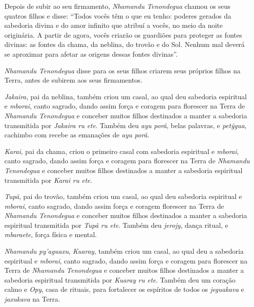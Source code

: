  



Depois de subir ao seu firmamento, \emph{Nhamandu Tenondegua} chamou os
seus quatros filhos e disse: ``Todos vocês têm o que eu tenho: poderes
gerados da sabedoria divina e do amor infinito que atribuí a vocês, no
meio da noite originária. A partir de agora, vocês criarão os guardiões
para proteger as fontes divinas: as fontes da chama, da neblina, do
trovão e do Sol. Nenhum mal deverá se aproximar para afetar as origens
dessas fontes divinas''.

\emph{Nhamandu Tenondegua} disse para os seus filhos criarem seus
próprios filhos na Terra, antes de subirem aos seus firmamentos.

\emph{Jakaira}, pai da neblina, também criou um casal, ao qual deu
sabedoria espiritual e \emph{mborai}, canto sagrado, dando assim força e
coragem para florescer na Terra de \emph{Nhamandu Tenondegua} e conceber
muitos filhos destinados a manter a sabedoria transmitida por
\emph{Jakaira ru ete}. Também deu \emph{ayu porã}, belas palavras, e
\emph{petỹgua}, cachimbo com recebe as emanações de \emph{ayu porã}.


 

\emph{Karai}, pai da chama, criou o primeiro casal com sabedoria
espiritual e \emph{mborai}, canto sagrado, dando assim força e coragem
para florescer na Terra de \emph{Nhamandu Tenondegua} e conceber muitos
filhos destinados a manter a sabedoria espiritual transmitida por
\emph{Karai ru ete}.

\emph{Tupã}, pai do trovão, também criou um casal, ao qual deu sabedoria
espiritual e \emph{mborai}, canto sagrado, dando assim força e coragem
florescer na Terra de \emph{Nhamandu Tenondegua} e conceber muitos
filhos destinados a manter a sabedoria espiritual transmitida por
\emph{Tupã ru ete}. Também deu \emph{jerojy}, dança ritual, e
\emph{mbaraete}, força física e mental.

\emph{Nhamandu py'aguaxu}, \emph{Kuaray}, também criou um casal, ao qual
deu a sabedoria espiritual e \emph{mborai}, canto sagrado, dando assim
força e coragem para florescer na Terra de \emph{Nhamandu}
\emph{Tenondegua} e conceber muitos filhos destinados a manter a
sabedoria espiritual transmitida por \emph{Kuaray ru ete}. Também deu um
coração calmo e \emph{Opy}, casa de rituais, para fortalecer os
espíritos de todos os \emph{jeguakava} e \emph{jaxukava} na Terra.

